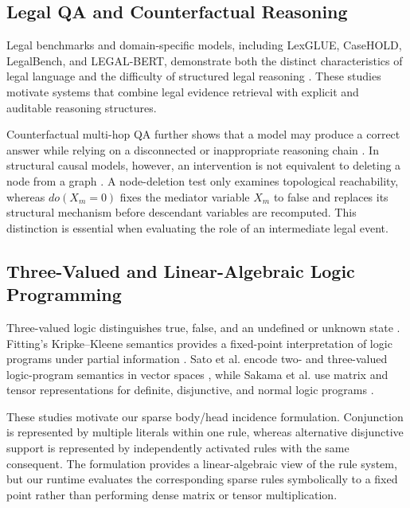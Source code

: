 \subsection{Legal QA and Counterfactual Reasoning}

Legal benchmarks and domain-specific models, including LexGLUE, CaseHOLD,
LegalBench, and LEGAL-BERT, demonstrate both the distinct characteristics of
legal language and the difficulty of structured legal reasoning
\cite{chalkidis2022lexglue,zheng2021casehold,guha2023legalbench,
chalkidis2020legalbert}. These studies motivate systems that combine legal
evidence retrieval with explicit and auditable reasoning structures.

Counterfactual multi-hop QA further shows that a model may produce a correct
answer while relying on a disconnected or inappropriate reasoning chain
\cite{guo2023counterfactual}. In structural causal models, however, an
intervention is not equivalent to deleting a node from a graph
\cite{pearl2009causality}. A node-deletion test only examines topological
reachability, whereas $do(X_m=0)$ fixes the mediator variable $X_m$ to false
and replaces its structural mechanism before descendant variables are
recomputed. This distinction is essential when evaluating the role of an
intermediate legal event.

\subsection{Three-Valued and Linear-Algebraic Logic Programming}

Three-valued logic distinguishes true, false, and an undefined or unknown state
\cite{kleene1952metamathematics}. Fitting's Kripke--Kleene semantics provides a
fixed-point interpretation of logic programs under partial information
\cite{fitting1985kripke}. Sato et al. encode two- and three-valued logic-program
semantics in vector spaces \cite{sato2020threevalued}, while Sakama et al. use
matrix and tensor representations for definite, disjunctive, and normal logic
programs \cite{sakama2021tensor}.

These studies motivate our sparse body/head incidence formulation. Conjunction
is represented by multiple literals within one rule, whereas alternative
disjunctive support is represented by independently activated rules with the
same consequent. The formulation provides a linear-algebraic view of the rule
system, but our runtime evaluates the corresponding sparse rules symbolically
to a fixed point rather than performing dense matrix or tensor multiplication.

